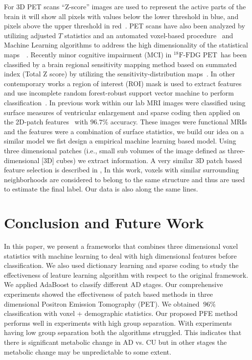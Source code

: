 \documentclass[authoryear,preprint,revi	ew,12pt]{elsarticle}
\newcommand{\FDGPET}   {$ ^{18}\textrm{F-FDG PET} $}
\begin{document}
For 3D PET scans ``Z-score'' images are used to represent the active parts of the brain it will show all pixels with values below the lower threshold in blue, and pixels above the upper threshold in red~\citep{ishii2014pet}. PET scans have also been analyzed by utilizing adjusted $T$ statistics and an automated voxel-based procedure~\citep{herholz2002discrimination} and Machine Learning algorithms to address the high dimensionality of the statistical maps~\citep{illan201118}~\citep{higdon2004comparison}. Recently minor cognitive impairment (MCI) in \FDGPET ~has been classified by a brain regional sensitivity mapping method based on summated index (Total Z score) by utilizing the sensitivity-distribution maps~\citep{kakimoto2011new}. In other contemporary works a region of interest (ROI) mask is used to extract features and use incomplete random forest-robust support vector machine to perform classification~\citep{lu2017early}. In previous work within our lab MRI images were classified using surface measures of ventricular enlargement and sparse coding then applied on the 2D-patch features~\citep*{zhang2016hyperbolic,zhang2016applying} with $ 96.7 \% $ accuracy. These images were functional MRIs and the features were a combination of surface statistics, we build our idea on a similar model we fist design a empirical machine learning based model. Using three dimensional patches (i.e., small sub volumes of the image defined as three-dimensional [3D] cubes) we extract information. A very similar 3D patch based feature selection is described in \citep{coupe2011patch}, In  this work, voxels  with  similar  surrounding  neighborhoods  are  considered  to  belong  to  the  same  structure and thus are used to estimate the final label. Our data is also along the same lines. 



\section{Conclusion and Future Work}
In this paper, we present a frameworks that combines three dimensional voxel statistics with machine learning to deal with high dimensional features before classification. We also used dictionary learning and sparse coding to study the effectiveness of leature learning algorithm with respect to the original framework. We applied AdaBoost to classify different AD stages. Our comprehensive experiments showed the effectiveness of patch based methods in three dimensional Positron Emission Tomography (PET). We obtained $ ~96 \% $ classification with voxel + demographic statistics.
Our proposed PFE method performs well in experiments with high group separation. With experiments having low group separation both the algorithms struggled. This indicates that there is significant metabolic change in AD vs. CU but in other stages the metabolic change may be unpredictable to some extent. 
\end{document}
